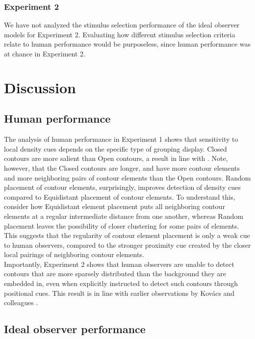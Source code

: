 \documentclass[12pt]{article}
\begin{document}
\subsubsection{Experiment 2}
We have not analyzed the stimulus selection performance of the ideal observer models for Experiment 2. Evaluating how different stimulus selection criteria relate to human performance would be purposeless, since human performance was at chance in Experiment 2.


\section{Discussion}\label{section_discussion}

\subsection{Human performance}\label{subsection_discussion_human}
The analysis of human performance in Experiment 1 shows that sensitivity to local density cues depends on the specific type of grouping display. Closed contours are more salient than Open contours, a result in line with . Note, however, that the Closed contours are longer, and have more contour elements and more neighboring pairs of contour elements \cite<see also>{Tversky04} than the Open contours. Random placement of contour elements, surprisingly, improves detection of density cues compared to Equidistant placement of contour elements. To understand this, consider how Equidistant element placement puts all neighboring contour elements at a regular intermediate distance from one another, whereas Random placement leaves the possibility of closer clustering for some pairs of elements. This suggests that the regularity of contour element placement is only a weak cue to human observers, compared to the stronger proximity cue created by the closer local pairings of neighboring contour elements.\\

Importantly, Experiment 2 shows that human observers are unable to detect contours that are more sparsely distributed than the background they are embedded in, even when explicitly instructed to detect such contours through positional cues. This result is in line with earlier observations by Kov{\'a}cs and colleagues \citeyear{Kovacs99, Kovacs00}.

\subsection{Ideal observer performance}\label{subsection_discussion_ideal}
\end{document}

